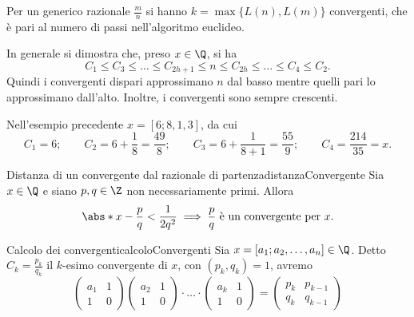 	\begin{oss}
	Per un generico razionale \(\frac{m}{n}\) si hanno \(k=\max\{L(n),L(m)\}\) convergenti, che è pari al numero di passi nell'algoritmo euclideo.
	\end{oss}

	\begin{oss}
	In generale si dimostra che, preso \(x\in\Q\), si ha
		\[
		C_1 \le C_3 \le \ldots \le C_{2h+1} \le n \le C_{2h} \le \ldots \le C_4 \le C_2.
		\]
	Quindi i convergenti dispari approssimano \(n\) dal basso mentre quelli pari lo approssimano dall'alto. Inoltre, i convergenti sono sempre crescenti.
	\end{oss}


	\begin{ese}
	Nell'esempio precedente \(x=[6;8,1,3]\), da cui
		\[
		C_1 = 6; \qquad C_2 = 6+\frac{1}{8} = \frac{49}{8}; \qquad C_3 = 6+\frac{1}{8+1} = \frac{55}{9}; \qquad C_4 = \frac{214}{35}=x.
		\]
	\end{ese}

	\begin{teor}{Distanza di un convergente dal razionale di partenza}{distanzaConvergente}
	Sia \(x\in\Q\) e siano \(p,q\in\Z\) non necessariamente primi.
	Allora
		\[
		\abs*{x- \frac{p}{q}} < \frac{1}{2q^2} \implies \frac{p}{q} \text{ è un convergente per }x.
		\]
	\end{teor}
%
%

	\begin{prop}{Calcolo dei convergenti}{calcoloConvergenti}
	Sia \(x=[a_1;a_2,\ldots,a_n]\in \Q\). Detto \(C_k=\frac{p_k}{q_k}\) il \(k\)-esimo convergente di \(x\), con \((p_k,q_k)=1\), avremo
		\[
		\begin{pmatrix}a_1 & 1\\1 & 0\end{pmatrix}\begin{pmatrix}a_2 & 1\\1 & 0\end{pmatrix} \cdot\ldots\cdot \begin{pmatrix}a_k & 1\\1 & 0\end{pmatrix} = \begin{pmatrix}p_k & p_{k-1}\\q_k & q_{k-1}\end{pmatrix}
		\]
	\end{prop}

